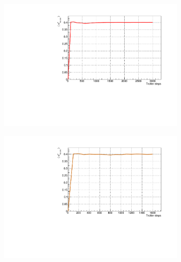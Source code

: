 \begin{figure}[H]
\centering
\begin{subfigure}{\columnwidth}
\centering
    \includegraphics[scale=0.6]{Figures/convergence/Convergence_s8T3000J1051.pdf}
    \label{fig:8sites_LMvsGamma}
\end{subfigure}\quad
\begin{subfigure}{\columnwidth}
\centering
    \includegraphics[scale=0.6]{Figures/convergence/Convergence_LM_L012_m060_Time001600_J1051.pdf}
    \label{fig:12sites_LMvsGamma}
\end{subfigure}\\
\begin{subfigure}{\columnwidth}
\centering

\end{subfigure}
\end{figure}
